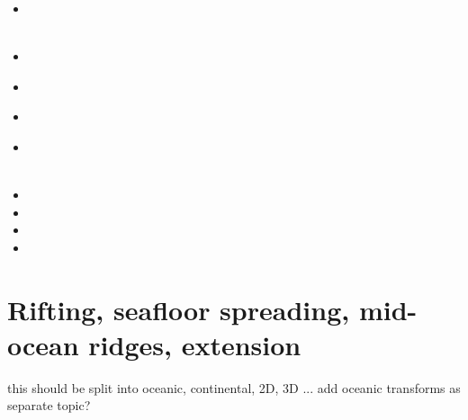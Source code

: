 \begin{scriptsize}
\begin{itemize}
\item[\twothousandthirteen] 
 \\
 \\
\item[\twothousandfourteen] 
\item[\twothousandfifteen] 
 \\
\item[\twothousandseventeen] 
\item[\twothousandnineteen] 
 \\
 \\
\item[\twothousandtwenty] 
\item[\twothousandtwentyone] 
\item[\twothousandtwentytwo] 
\item[\twothousandtwentythree] 
\end{itemize}
\end{scriptsize}

\section{Rifting, seafloor spreading, mid-ocean ridges, extension}

{\color{red} this should be split into oceanic, continental, 2D, 3D ...}
add oceanic transforms as separate topic?

